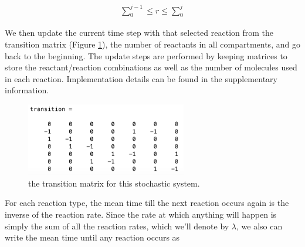 \documentclass[fleqn,10pt]{wlscirep}
\begin{document}
    \begin{align*}
        \sum\limits_0^{j-1} \leq r \leq \sum\limits_0^j
    \end{align*}
    
We then update the current time step with that selected reaction from the transition matrix (Figure \ref{fig:transition}), the number of reactants in all compartments, and go back to the beginning. The update steps are performed by keeping matrices to store the reactant/reaction combinations as well as the number of molecules used in each reaction. Implementation details can be found in the supplementary information.

\begin{figure}[ht]
\centering
\includegraphics[width=7cm]{transition}
\caption{the transition matrix for this stochastic system.}
\label{fig:transition} 
\end{figure}

For each reaction type, the mean time till the next reaction occurs again is the inverse of the reaction rate.  Since the rate at which anything will happen is simply the sum of all the reaction rates, which we'll denote by $\lambda$, we also can write the mean time until any reaction occurs as   
\end{document}
